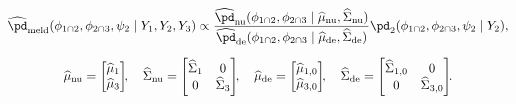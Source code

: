 \begin{equation}
\begin{gathered}
  \widehat{\pd}_{\text{meld}} (\phi_{1 \cap 2}, \phi_{2 \cap 3}, \psi_{2} \mid Y_{1}, Y_{2}, Y_{3})
  \propto
  \frac {
    \widehat{\pd}_{\text{nu}}(\phi_{1 \cap 2}, \phi_{2 \cap 3} \mid \widehat{\mu}_{\text{nu}}, \widehat{\Sigma}_{\text{nu}})
  } {
    \widehat{\pd}_{\text{de}}(\phi_{1 \cap 2}, \phi_{2 \cap 3} \mid \widehat{\mu}_{\text{de}}, \widehat{\Sigma}_{\text{de}})
  }
  \pd_{2}(\phi_{1 \cap 2}, \phi_{2 \cap 3}, \psi_{2} \mid Y_{2}), \\[1.5ex]
  \widehat{\mu}_{\text{nu}} = \begin{bmatrix}
    \widehat{\mu}_{1} \\
    \widehat{\mu}_{3}
  \end{bmatrix}\!\!, \quad
  \widehat{\Sigma}_{\text{nu}} = \begin{bmatrix}
    \widehat{\Sigma}_{1} & 0 \\
    0 & \widehat{\Sigma}_{3}
  \end{bmatrix}\!\!, \quad
  \widehat{\mu}_{\text{de}} = \begin{bmatrix}
    \widehat{\mu}_{1, 0} \\
    \widehat{\mu}_{3, 0}
  \end{bmatrix}\!\!, \quad
  \widehat{\Sigma}_{\text{de}} = \begin{bmatrix}
    \widehat{\Sigma}_{1, 0} & 0 \\
    0 & \widehat{\Sigma}_{3, 0}
  \end{bmatrix}\!\!.
\end{gathered}
\label{eqn:normal-approx-nu-de-form}
\end{equation}
  